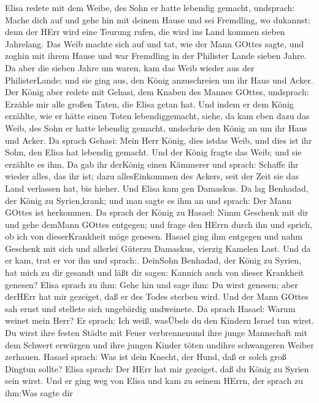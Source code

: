  Elisa redete mit dem Weibe, des Sohn er hatte lebendig
gemacht, undsprach: Mache dich auf und gehe hin mit deinem Hause und sei
Fremdling, wo dukannst; denn der HErr wird eine Teurung rufen, die wird
ins Land kommen sieben Jahrelang.  Das Weib machte sich auf
und tat, wie der Mann GOttes sagte, und zoghin mit ihrem Hause und war
Fremdling in der Philister Lande sieben Jahre.  Da aber die
sieben Jahre um waren, kam das Weib wieder aus der PhilisterLande; und
sie ging aus, den König anzuschreien um ihr Haus und Acker. 
Der König aber redete mit Gehasi, dem Knaben des Mannes GOttes,
undsprach: Erzähle mir alle großen Taten, die Elisa getan hat.
 Und indem er dem König erzählte, wie er hätte einen Toten
lebendiggemacht, siehe, da kam eben dazu das Weib, des Sohn er hatte
lebendig gemacht, undschrie den König an um ihr Haus und Acker. Da
sprach Gehasi: Mein Herr König, dies istdas Weib, und dies ist ihr Sohn,
den Elisa hat lebendig gemacht.  Und der König fragte das
Weib; und sie erzählte es ihm. Da gab ihr derKönig einen Kämmerer und
sprach: Schaffe ihr wieder alles, das ihr ist; dazu allesEinkommen des
Ackers, seit der Zeit sie das Land verlassen hat, bis hieher.
 Und Elisa kam gen Damaskus. Da lag Benhadad, der König zu
Syrien,krank; und man sagte es ihm an und sprach: Der Mann GOttes ist
herkommen.  Da sprach der König zu Hasael: Nimm Geschenk mit
dir und gehe demMann GOttes entgegen; und frage den HErrn durch ihn und
sprich, ob ich von dieserKrankheit möge genesen.  Hasael
ging ihm entgegen und nahm Geschenk mit sich und allerlei Güterzu
Damaskus, vierzig Kamelen Last. Und da er kam, trat er vor ihn und
sprach:. DeinSohn Benhadad, der König zu Syrien, hat mich zu dir gesandt
und läßt dir sagen: Kannich auch von dieser Krankheit genesen?
 Elisa sprach zu ihm: Gehe hin und sage ihm: Du wirst
genesen; aber derHErr hat mir gezeiget, daß er des Todes sterben wird.
 Und der Mann GOttes sah ernst und stellete sich ungebärdig
undweinete.  Da sprach Hasael: Warum weinet mein Herr? Er
sprach: Ich weiß, wasÜbels du den Kindern Israel tun wirst. Du wirst
ihre festen Städte mit Feuer verbrennenund ihre junge Mannschaft mit dem
Schwert erwürgen und ihre jungen Kinder töten undihre schwangeren Weiber
zerhauen.  Hasael sprach: Was ist dein Knecht, der Hund,
daß er solch groß Dingtun sollte? Elisa sprach: Der HErr hat mir
gezeiget, daß du König zu Syrien sein wirst.  Und er ging
weg von Elisa und kam zu seinem HErrn, der sprach zu ihm:Was sagte dir
